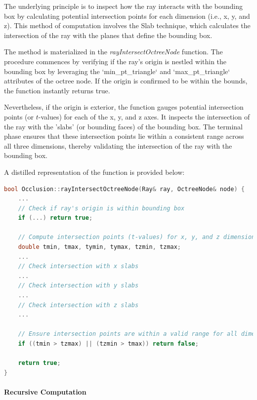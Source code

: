 \documentclass[11pt, a4paper,oneside,chapterprefix=false]{scrbook}
\begin{document}
The underlying principle is to inspect how the ray interacts with the bounding box by calculating potential intersection points for each dimension (i.e., x, y, and z). This method of computation involves the Slab technique, which calculates the intersection of the ray with the planes that define the bounding box.

\vspace{10pt}

The method is materialized in the \textit{rayIntersectOctreeNode} function. The procedure commences by verifying if the ray's origin is nestled within the bounding box by leveraging the `min\_pt\_triangle` and `max\_pt\_triangle` attributes of the octree node. If the origin is confirmed to be within the bounds, the function instantly returns true.

\vspace{10pt}

Nevertheless, if the origin is exterior, the function gauges potential intersection points (or \( t \)-values) for each of the x, y, and z axes. It inspects the intersection of the ray with the 'slabs' (or bounding faces) of the bounding box. The terminal phase ensures that these intersection points lie within a consistent range across all three dimensions, thereby validating the intersection of the ray with the bounding box.

\vspace{10pt}

A distilled representation of the function is provided below:

\begin{lstlisting}[language=C++, caption=Simplified Ray Intersect Bounding Box]
bool Occlusion::rayIntersectOctreeNode(Ray& ray, OctreeNode& node) {
    ...
    // Check if ray's origin is within bounding box
    if (...) return true;
    
    // Compute intersection points (t-values) for x, y, and z dimensions
    double tmin, tmax, tymin, tymax, tzmin, tzmax;
    ...
    // Check intersection with x slabs
    ...
    // Check intersection with y slabs
    ...
    // Check intersection with z slabs
    ...

    // Ensure intersection points are within a valid range for all dimensions
    if ((tmin > tzmax) || (tzmin > tmax)) return false;
    
    return true;
}
\end{lstlisting}

\paragraph{Recursive Computation}
\end{document}
